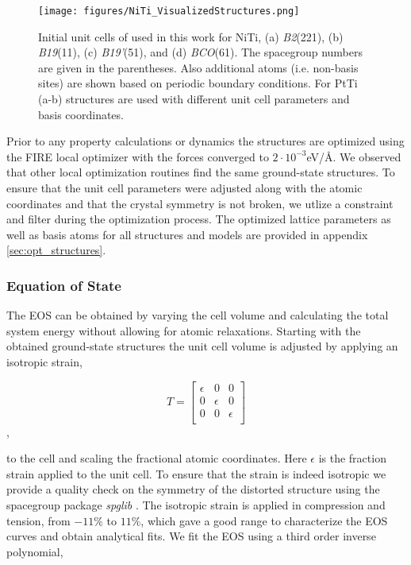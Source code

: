 \documentclass[preprint]{elsarticle}
\begin{document}
\begin{figure}[ht!]
    \begin{centering}
        \texttt{[image: figures/NiTi\_VisualizedStructures.png]}
        \caption{
          Initial unit cells of used in this work for NiTi, (a) \textit{B2}(221), (b) \textit{B19}(11), (c) \textit{B19'}(51), and (d) \textit{BCO}(61). The spacegroup numbers are given in the parentheses. Also additional atoms (i.e. non-basis sites) are shown based on periodic boundary conditions. For PtTi (a-b) structures are used with different unit cell parameters and basis coordinates. 
        }
        \label{fig:niti_structures}
    \end{centering}
\end{figure}

Prior to any property calculations or dynamics the structures are optimized using the FIRE\cite{Bitzek2006} local optimizer with the forces converged to $2\cdot 10^{-3}$eV/\AA. We observed that other local optimization routines find the same ground-state structures. To ensure that the unit cell parameters were adjusted along with the atomic coordinates and that the crystal symmetry is not broken, we utlize a constraint and filter during the optimization process. The optimized lattice parameters as well as basis atoms for all structures and models are provided in appendix \ref{sec:opt_structures}. \par

\subsubsection{Equation of State}
The EOS can be obtained by varying the cell volume and calculating the total system energy without allowing for atomic relaxations. Starting with the obtained ground-state structures the unit cell volume is adjusted by applying an isotropic strain,

\begin{equation}
  \label{eq:isotropic_strain}
  T=\begin{bmatrix}
    \epsilon & 0 & 0 \\
    0 & \epsilon & 0 \\
    0 & 0 & \epsilon \\
  \end{bmatrix}
\end{equation},

to the cell and scaling the fractional atomic coordinates. Here $\epsilon$ is the fraction strain applied to the unit cell. To ensure that the strain is indeed isotropic we provide a quality check on the symmetry of the distorted structure using the spacegroup package \textit{spglib} \cite{Togo2018}. The isotropic strain is applied in compression and tension, from $-11\%$ to $11\%$, which gave a good range to characterize the EOS curves and obtain analytical fits. We fit the EOS using a third order inverse polynomial,
\end{document}
